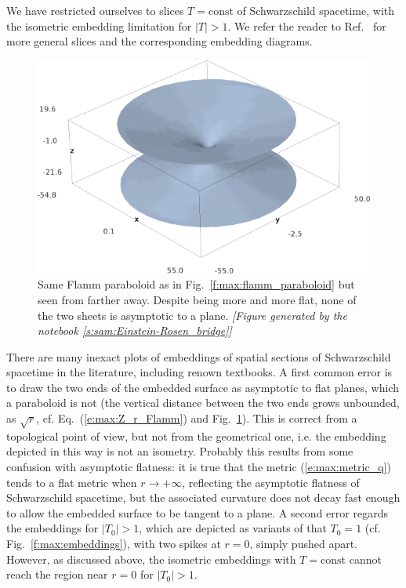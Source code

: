 \begin{remark}
We have restricted ourselves to slices $T=\mathrm{const}$ of Schwarzschild
spacetime, with the isometric embedding limitation for $|T|>1$. We refer the
reader to Ref.~\cite{CollaK12} for more general slices and the corresponding
embedding diagrams.
\end{remark}

\begin{figure}
\centerline{\includegraphics[height=0.3\textheight]{max_flamm_paraboloid_far.png}}
\caption[]{\label{f:max:flamm_paraboloid_far} \footnotesize
Same Flamm paraboloid as in Fig.~\ref{f:max:flamm_paraboloid}
but seen from farther away. Despite being more and more flat, none of the two sheets
is asymptotic to a plane.
\textsl{[Figure generated by the notebook \ref{s:sam:Einstein-Rosen_bridge}]}
}
\end{figure}

\begin{remark}
There are many inexact plots of embeddings of spatial sections
of Schwarz\-schild spacetime in the literature, including renown textbooks.
A first common error is to draw the two ends of the embedded surface as asymptotic to flat
planes, which a paraboloid is not (the vertical distance between the two ends grows
unbounded, as $\sqrt{r}$, cf. Eq.~(\ref{e:max:Z_r_Flamm}) and Fig.~\ref{f:max:flamm_paraboloid_far}).
This is correct from a topological point of view,
but not from the geometrical one, i.e. the embedding depicted in this way
is not an isometry. Probably this results from some confusion with asymptotic
flatness: it is true that the metric (\ref{e:max:metric_q}) tends
to a flat metric when $r\rightarrow +\infty$, reflecting the asymptotic
flatness of Schwarzschild spacetime, but the associated curvature does not
decay fast enough to allow the embedded surface to be tangent to a plane.
A second error regards the embeddings for $|T_0|> 1$, which
are depicted as variants of that $T_0=1$ (cf. Fig.~\ref{f:max:embeddings}),
with two spikes at $r=0$, simply pushed apart. However,
as discussed above, the isometric embeddings with $T=\mathrm{const}$
cannot reach the region near $r=0$ for $|T_0|> 1$.
\end{remark}

